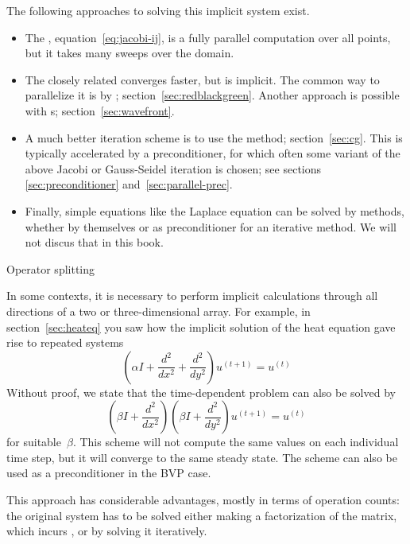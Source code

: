 The following approaches to solving this implicit system exist.
\begin{itemize}
\item The , equation~\eqref{eq:jacobi-ij},
  is a fully parallel computation over all points,
  but it takes many sweeps over the domain.
\item The closely related 
  converges faster, but is implicit.
  The common way to parallelize it is by ;
  section~\ref{sec:redblackgreen}.
  Another approach is possible with s; section~\ref{sec:wavefront}.
\item A much better iteration scheme is to use the  method;
  section~\ref{sec:cg}.
  This is typically accelerated by a preconditioner,
  for which often some variant of the above Jacobi or Gauss-Seidel iteration is chosen;
  see sections \ref{sec:preconditioner} and~\ref{sec:parallel-prec}.
\item Finally, simple equations like the Laplace equation
  can be solved by  methods,
  whether by themselves or as preconditioner for an iterative method.
  We will not discus that in this book.
\end{itemize}

 {Operator splitting}

In some contexts, it is necessary to perform implicit calculations
through all directions of a two or three-dimensional array. For
example, in section~\ref{sec:heateq} you saw how the implicit solution
of the heat equation
gave rise to repeated systems
\begin{equation}
  (\alpha I+\frac {d^2}{dx^2}+\frac{d^2}{dy^2})u^{(t+1)}=u^{(t)}
  \label{eq:heat-recap}
\end{equation}
Without proof, we state that the time-dependent problem can also be solved by
\begin{equation}
  (\beta I+\frac {d^2}{dx^2})(\beta I+\frac{d^2}{dy^2})u^{(t+1)}=u^{(t)}
  \label{eq:adi-recap}
\end{equation}
for suitable~$\beta$. This scheme will not compute the same
values on each individual time step, but it will converge to the same
steady state. The scheme can also be used as a preconditioner in the
\ac{BVP} case.

This approach has considerable advantages, mostly in terms of
operation counts: the original system has to be solved either making a
factorization of the matrix, which incurs , or by
solving it iteratively.

